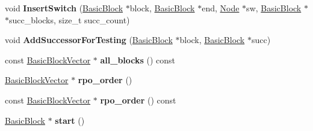 \begin{DoxyCompactItemize}
\item 
void {\bfseries Insert\+Switch} (\hyperlink{classv8_1_1internal_1_1compiler_1_1_basic_block}{Basic\+Block} $\ast$block, \hyperlink{classv8_1_1internal_1_1compiler_1_1_basic_block}{Basic\+Block} $\ast$end, \hyperlink{classv8_1_1internal_1_1compiler_1_1_node}{Node} $\ast$sw, \hyperlink{classv8_1_1internal_1_1compiler_1_1_basic_block}{Basic\+Block} $\ast$$\ast$succ\+\_\+blocks, size\+\_\+t succ\+\_\+count)\hypertarget{classv8_1_1internal_1_1compiler_1_1_schedule_a33f5241789c541d2973ed9672010d6d3}{}\label{classv8_1_1internal_1_1compiler_1_1_schedule_a33f5241789c541d2973ed9672010d6d3}

\item 
void {\bfseries Add\+Successor\+For\+Testing} (\hyperlink{classv8_1_1internal_1_1compiler_1_1_basic_block}{Basic\+Block} $\ast$block, \hyperlink{classv8_1_1internal_1_1compiler_1_1_basic_block}{Basic\+Block} $\ast$succ)\hypertarget{classv8_1_1internal_1_1compiler_1_1_schedule_a37aed87f4e78d532fb64134f432d072d}{}\label{classv8_1_1internal_1_1compiler_1_1_schedule_a37aed87f4e78d532fb64134f432d072d}

\item 
const \hyperlink{classv8_1_1internal_1_1_zone_vector}{Basic\+Block\+Vector} $\ast$ {\bfseries all\+\_\+blocks} () const \hypertarget{classv8_1_1internal_1_1compiler_1_1_schedule_ae778a3be2fa270a47d7c79ee1d98b989}{}\label{classv8_1_1internal_1_1compiler_1_1_schedule_ae778a3be2fa270a47d7c79ee1d98b989}

\item 
\hyperlink{classv8_1_1internal_1_1_zone_vector}{Basic\+Block\+Vector} $\ast$ {\bfseries rpo\+\_\+order} ()\hypertarget{classv8_1_1internal_1_1compiler_1_1_schedule_ae0435eea7343bd7bd3baa1ac497a2524}{}\label{classv8_1_1internal_1_1compiler_1_1_schedule_ae0435eea7343bd7bd3baa1ac497a2524}

\item 
const \hyperlink{classv8_1_1internal_1_1_zone_vector}{Basic\+Block\+Vector} $\ast$ {\bfseries rpo\+\_\+order} () const \hypertarget{classv8_1_1internal_1_1compiler_1_1_schedule_a3cc2b1cdf4ed314f74ff5360b3d217d0}{}\label{classv8_1_1internal_1_1compiler_1_1_schedule_a3cc2b1cdf4ed314f74ff5360b3d217d0}

\item 
\hyperlink{classv8_1_1internal_1_1compiler_1_1_basic_block}{Basic\+Block} $\ast$ {\bfseries start} ()\hypertarget{classv8_1_1internal_1_1compiler_1_1_schedule_adddc0d247b7f03ccf5796854cf34b4bc}{}\label{classv8_1_1internal_1_1compiler_1_1_schedule_adddc0d247b7f03ccf5796854cf34b4bc}


\end{DoxyCompactItemize}

